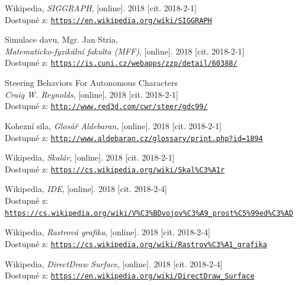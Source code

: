 \documentclass[czech,public,dept460,male,cpdeclaration]{diploma}
\begin{document}
\begin{thebibliography}{99}
	 Wikipedia,
		\textit{SIGGRAPH}, [online]. 2018 [cit. 2018-2-1]\\
		Dostupné z: \href{https://en.wikipedia.org/wiki/SIGGRAPH}{\texttt{https://en.wikipedia.org/wiki/SIGGRAPH}}
		
	 Simulace davu, Mgr. Jan Stria,\\
		\textit{Matematicko-fyzikální fakulta (MFF)}, [online]. 2018 [cit. 2018-2-1]\\
		Dostupné z: \href{https://is.cuni.cz/webapps/zzp/detail/60388/}{\texttt{https://is.cuni.cz/webapps/zzp/detail/60388/}}
		
	 Steering Behaviors For Autonomous Characters\\
		\textit{Craig W. Reynolds}, [online]. 2018 [cit. 2018-2-1]\\
		Dostupné z: \href{http://www.red3d.com/cwr/steer/gdc99/}{\texttt{http://www.red3d.com/cwr/steer/gdc99/}}
		
	 Kohezní síla,
		\textit{Glosář Aldebaran}, [online]. 2018 [cit. 2018-2-1]\\
		Dostupné z: \href{http://www.aldebaran.cz/glossary/print.php?id=1894}{\texttt{http://www.aldebaran.cz/glossary/print.php?id=1894}}
		
	 Wikipedia,
		\textit{Skalár}, [online]. 2018 [cit. 2018-2-1]\\
		Dostupné z: \href{https://cs.wikipedia.org/wiki/Skal\%C3\%A1r}{\texttt{https://cs.wikipedia.org/wiki/Skal\%C3\%A1r}}
		
	 Wikipedia,
		\textit{IDE}, [online]. 2018 [cit. 2018-2-4]\\
		Dostupné z: \href{https://cs.wikipedia.org/wiki/V\%C3\%BDvojov\%C3\%A9\_prost\%C5\%99ed\%C3\%AD}{\texttt{https://cs.wikipedia.org/wiki/V\%C3\%BDvojov\%C3\%A9\_prost\%C5\%99ed\%C3\%AD}}
		
	 Wikipedia,
		\textit{Rastrová grafika}, [online]. 2018 [cit. 2018-2-4]\\
		Dostupné z: \href{https://cs.wikipedia.org/wiki/Rastrov\%C3\%A1\_grafika}{\texttt{https://cs.wikipedia.org/wiki/Rastrov\%C3\%A1\_grafika}}
		
	 Wikipedia,
		\textit{DirectDraw Surface}, [online]. 2018 [cit. 2018-2-4]\\
		Dostupné z: \href{https://en.wikipedia.org/wiki/DirectDraw\_Surface}{\texttt{https://en.wikipedia.org/wiki/DirectDraw\_Surface}}
		

\end{thebibliography}
\end{document}
